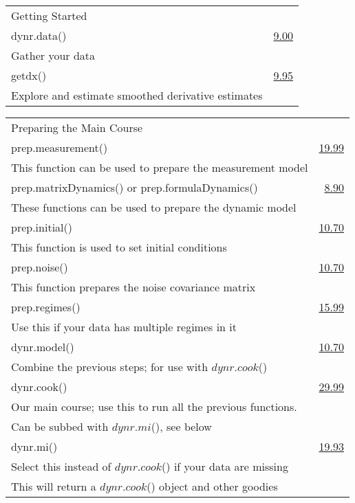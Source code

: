 \documentclass[12pt]{article}
\makeatletter
\newcommand*\ColText[1]{\textcolor{PennSky}{#1}}
\newenvironment{Group}[1]
  {\noindent\begin{tabular*}{\textwidth}{@{}p{.8\linewidth}@{\extracolsep{\fill}}r@{}}
    {\fontsize{22}{29}\selectfont\ColText{#1}}\\[0.8em]}
  {\end{tabular*}}
\newcommand*\Entry[2]{%
  \sffamily#1 & #2}
\newcommand*\Expl[1]{%
  \hspace*{1em}\footnotesize #1}
\makeatother
\begin{document}
	\\
\begin{Group}{Getting Started}
\Entry{dynr.data()}{\href{https://rdrr.io/cran/dynr/man/dynr.data.html}{9.00}} \\
\Expl{Gather your data} \\
\Entry{getdx()}{\href{https://rdrr.io/cran/dynr/man/getdx.html}{9.95}} \\
\Expl{Explore and estimate smoothed derivative estimates} \\
\end{Group}

\vspace{0.25cm}

\begin{Group}{Preparing the Main Course}
\Entry{prep.measurement()}{\href{https://rdrr.io/cran/dynr/man/prep.measurement.html}{19.99}} \\ 
\Expl{This function can be used to prepare the measurement model} \\
\Entry{prep.matrixDynamics() or prep.formulaDynamics()}{\href{https://rdrr.io/cran/dynr/man/prep.formulaDynamics.html}{8.90}} \\ 
\Expl{These functions can be used to prepare the dynamic model} \\ 
\Entry{prep.initial()}{\href{https://rdrr.io/cran/dynr/man/prep.initial.html}{10.70}} \\ 
\Expl{This function is used to set initial conditions} \\
\Entry{prep.noise()}{\href{https://rdrr.io/cran/dynr/man/prep.noise.html}{10.70}} \\ 
\Expl{This function prepares the noise covariance matrix} \\
\Entry{[\emph{Optional}] prep.regimes()}{\href{https://rdrr.io/cran/dynr/man/prep.regimes.html}{15.99}} \\ 
\Expl{Use this if your data has multiple regimes in it} \\
\Entry{dynr.model()}{\href{https://rdrr.io/cran/dynr/man/dynr.model.html}{10.70}} \\ 
\Expl{Combine the previous steps; for use with $dynr.cook$()} \\
\Entry{dynr.cook()}{\href{https://rdrr.io/cran/dynr/man/dynr.cook.html}{29.99}} \\ 
\Expl{Our main course; use this to run all the previous functions.}\\
\Expl{Can be subbed with $dynr.mi$(), see below} \\
\Entry{[\emph{Alternative}] dynr.mi()}\href{https://rdrr.io/cran/dynr/man/dynr.mi.html}{{19.93}} \\ 
\Expl{Select this instead of $dynr.cook$() if your data are missing}\\
\Expl{This will return a $dynr.cook$() object and other goodies} \\
\end{Group}
\end{document}
